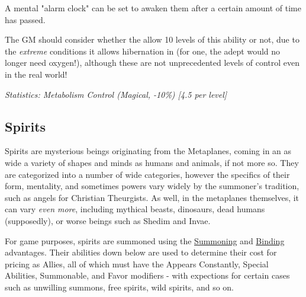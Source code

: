 \begin{multicols}{3}
		A mental "alarm clock" can be set to awaken them after a certain amount of time has passed.
		
		The GM should consider whether the allow 10 levels of this ability or not, due to the \textit{extreme} conditions it allows hibernation in (for one, the adept would no longer need oxygen!), although these are not unprecedented levels of control even in the real world! 

		\textcolor{OliveGreen}{\textit{Statistics: Metabolism Control (Magical, -10\%) [4.5 per level] }}

	\subsection{Spirits}
	
	Spirits are mysterious beings originating from the Metaplanes, coming in an as wide a variety of shapes and minds as humans and animals, if not more so. They are categorized into a number of wide categories, however the specifics of their form, mentality, and sometimes powers vary widely by the summoner's tradition, such as angels for Christian Theurgists. As well, in the metaplanes themselves, it can vary \textit{even more}, including mythical beasts, dinosaurs, dead humans (supposedly), or worse beings such as Shedim and Invae.
	
	For game purposes, spirits are summoned using the \hyperref[summoning]{Summoning} and \hyperref[binding_spirits]{Binding} advantages. Their abilities down below are used to determine their cost for pricing as Allies, all of which must have the Appears Constantly, Special Abilities, Summonable, and Favor modifiers - with expections for certain cases such as unwilling summons, free spirits, wild spirits, and so on.
	

\end{multicols}
